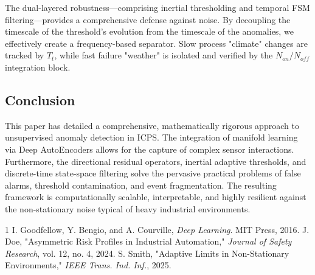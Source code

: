 \documentclass[journal]{IEEEtran}
\begin{document}
	The dual-layered robustness—comprising inertial thresholding and temporal FSM filtering—provides a comprehensive defense against noise. By decoupling the timescale of the threshold's evolution from the timescale of the anomalies, we effectively create a frequency-based separator. Slow process "climate" changes are tracked by $T_t$, while fast failure "weather" is isolated and verified by the $N_{on}/N_{off}$ integration block.
	
	\subsection{Conclusion}
	This paper has detailed a comprehensive, mathematically rigorous approach to unsupervised anomaly detection in ICPS. The integration of manifold learning via Deep AutoEncoders allows for the capture of complex sensor interactions. Furthermore, the directional residual operators, inertial adaptive thresholds, and discrete-time state-space filtering solve the pervasive practical problems of false alarms, threshold contamination, and event fragmentation. The resulting framework is computationally scalable, interpretable, and highly resilient against the non-stationary noise typical of heavy industrial environments.
	
	
	\begin{thebibliography}{1}
		 I. Goodfellow, Y. Bengio, and A. Courville, \emph{Deep Learning}. MIT Press, 2016.
		 J. Doe, "Asymmetric Risk Profiles in Industrial Automation," \emph{Journal of Safety Research}, vol. 12, no. 4, 2024.
		 S. Smith, "Adaptive Limits in Non-Stationary Environments," \emph{IEEE Trans. Ind. Inf.}, 2025.
	\end{thebibliography}
	
\end{document}
